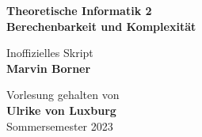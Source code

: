 \begin{titlepage}
	\begin{center}
		\vspace*{1cm}

		{\huge\textbf{Theoretische Informatik 2\bigskip\\Berechenbarkeit und Komplexität}}

		\vspace{0.5cm}
		{\Large Inoffizielles Skript}\\
		\textbf{Marvin Borner}

		\vfill

		Vorlesung gehalten von\\
		\textbf{Ulrike von Luxburg}\\
		Sommersemester 2023
	\end{center}
\end{titlepage}
